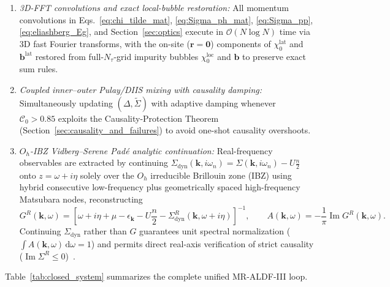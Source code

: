 \documentclass[11pt,a4paper]{article}
\numberwithin{equation}{section}
\theoremstyle{plain}
\theoremstyle{definition}
\providecommand{\vk}{\mathbf{k}}
\providecommand{\im}{\operatorname{Im}}
\providecommand{\dd}{\mathrm{d}}
\begin{document}
\begin{enumerate}
    \item \emph{3D-FFT convolutions and exact local-bubble restoration:} All momentum
    convolutions in Eqs.~\eqref{eq:chi_tilde_mat}, \eqref{eq:Sigma_ph_mat},
    \eqref{eq:Sigma_pp}, \eqref{eq:eliashberg_Eg}, and Section~\ref{sec:optics} execute
    in $\mathcal{O}(N\log N)$ time via 3D fast Fourier transforms, with the on-site
    ($\mathbf{r} = \mathbf{0}$) components of $\chi_0^{\mathrm{lat}}$ and
    $\mathbf{b}^{\mathrm{lat}}$ restored from full-$N_\tau$-grid impurity bubbles
    $\chi_0^{\mathrm{loc}}$ and $\mathbf{b}$ to preserve exact sum rules.

    \item \emph{Coupled inner--outer Pulay/DIIS mixing with causality damping:}
    Simultaneously updating $(\Delta, \tilde{\Sigma})$ with adaptive damping whenever
    $\mathcal{C}_0 > 0.85$ exploits the Causality-Protection Theorem
    (Section~\ref{sec:causality_and_failures}) to avoid one-shot causality overshoots.

    \item \emph{$O_h$-IBZ Vidberg--Serene Pad\'e analytic continuation:} Real-frequency
    observables are extracted by continuing
    $\Sigma_{\mathrm{dyn}}(\vk,i\omega_n) = \Sigma(\vk,i\omega_n) - U\frac{n}{2}$ onto
    $z = \omega + i\eta$ solely over the $O_h$ irreducible Brillouin zone (IBZ) using
    hybrid consecutive low-frequency plus geometrically spaced high-frequency Matsubara
    nodes, reconstructing
    \begin{equation}
        G^R(\vk,\omega)
        = \left[\omega + i\eta + \mu - \epsilon_{\vk} - U\frac{n}{2}
                - \Sigma_{\mathrm{dyn}}^R(\vk,\omega + i\eta)\right]^{-1},
        \qquad
        A(\vk,\omega) = -\frac{1}{\pi}\im G^R(\vk,\omega).
        \label{eq:pade_GR}
    \end{equation}
    Continuing $\Sigma_{\mathrm{dyn}}$ rather than $G$ guarantees unit spectral
    normalization ($\int A(\vk,\omega)\,\dd\omega = 1$) and permits direct real-axis
    verification of strict causality ($\im\Sigma^R \le 0$)~\cite{Vidberg1977}.
\end{enumerate}

Table~\ref{tab:closed_system} summarizes the complete unified MR-ALDF-III loop.
\end{document}

